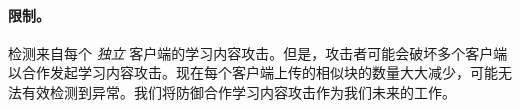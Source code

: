   
  
  \paragraph{限制。}
  \sysnameF 检测来自每个 {\em 独立} 客户端的学习内容攻击。但是，攻击者可能会破坏多个客户端以合作发起学习内容攻击。现在每个客户端上传的相似块的数量大大减少，\sysnameF 可能无法有效检测到异常。我们将防御合作学习内容攻击作为我们未来的工作。